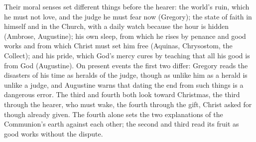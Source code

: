Their moral senses set different things before the hearer: the world's ruin,
which he must not love, and the judge he must fear now (Gregory); the state of
faith in himself and in the Church, with a daily watch because the hour is
hidden (Ambrose, Augustine); his own sleep, from which he rises by penance and
good works and from which Christ must set him free (Aquinas, Chrysostom, the
Collect); and his pride, which God's mercy cures by teaching that all his good
is from God (Augustine). On present events the first two differ: Gregory
reads the disasters of his time as heralds of the judge, though as unlike him
as a herald is unlike a judge, and Augustine warns that dating the end from
such things is a dangerous error. The third
and fourth both look toward Christmas, the third through the hearer, who must
wake, the fourth through the gift, Christ asked for though already given. The
fourth alone sets the two explanations of the Communion's earth against each
other; the second and third read its fruit as good works without the dispute.
